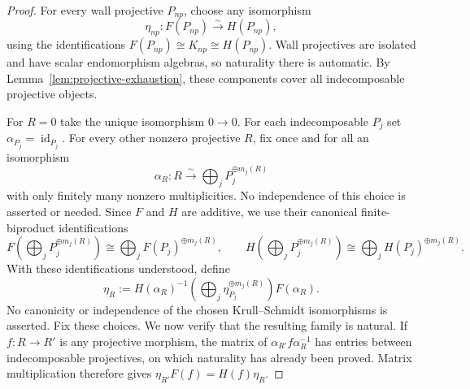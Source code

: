 \documentclass[10pt,a4paper]{amsart}
\newcommand{\id}{\operatorname{id}}
\begin{document}
\begin{proof}
For every wall projective $P_{np}$, choose any isomorphism
\[
 \eta_{np}:F(P_{np})\xrightarrow{\sim}H(P_{np}),
\]
using the identifications
$F(P_{np})\cong K_{np}\cong H(P_{np})$.  Wall projectives are isolated and
have scalar endomorphism algebras, so naturality there is automatic.
By Lemma~\ref{lem:projective-exhaustion}, these components cover all
indecomposable projective objects.

For $R=0$ take the unique isomorphism $0\to0$.  For each
indecomposable $P_j$ set $\alpha_{P_j}=\id_{P_j}$.  For every other
nonzero projective $R$, fix once and for all an isomorphism
\[
 \alpha_R:R\xrightarrow{\sim}
 \bigoplus_j P_j^{\oplus m_j(R)}
\]
with only finitely many nonzero multiplicities.  No independence of this
choice is asserted or needed.  Since $F$ and $H$ are additive, we use their canonical finite-biproduct identifications
\[
 F\!\left(\bigoplus_jP_j^{\oplus m_j(R)}\right)
 \cong\bigoplus_jF(P_j)^{\oplus m_j(R)},
 \qquad
 H\!\left(\bigoplus_jP_j^{\oplus m_j(R)}\right)
 \cong\bigoplus_jH(P_j)^{\oplus m_j(R)}.
\]
With these identifications understood, define
\[
 \eta_R:=
 H(\alpha_R)^{-1}
 \left(\bigoplus_j\eta_{P_j}^{\oplus m_j(R)}\right)
 F(\alpha_R).
\]
No canonicity or independence of the chosen Krull--Schmidt isomorphisms is
asserted.  Fix these choices.  We now verify that the resulting family is
natural.  If $f:R\to R'$ is any projective morphism, the matrix of
$\alpha_{R'}f\alpha_R^{-1}$ has entries between indecomposable
projectives, on which naturality has already been proved.  Matrix
multiplication therefore gives
$\eta_{R'}F(f)=H(f)\eta_R$.
\end{proof}
\end{document}
